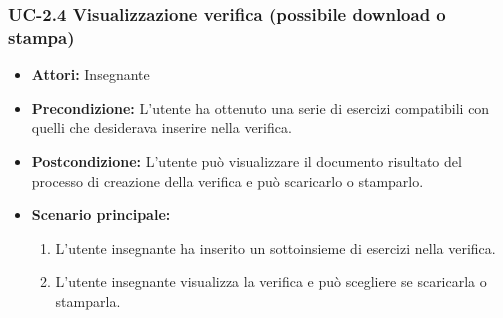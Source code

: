 \subsubsection{UC-2.4 Visualizzazione verifica (possibile download o stampa)}
\begin{itemize}
		\item \textbf{Attori: } Insegnante
		
		\item \textbf{Precondizione: }L'utente ha ottenuto una serie di esercizi compatibili con quelli che desiderava inserire nella verifica.
		\item \textbf{Postcondizione: }L'utente può visualizzare il documento risultato del processo di creazione della verifica e può scaricarlo o stamparlo.
		\item \textbf{Scenario principale: }
		\begin{enumerate}
		\item L'utente insegnante ha inserito un sottoinsieme di esercizi nella verifica.
		\item L'utente insegnante visualizza la verifica e può scegliere se scaricarla o stamparla.
		\end{enumerate}
\end{itemize}